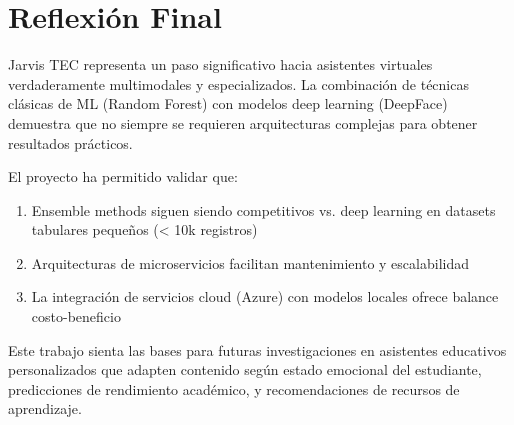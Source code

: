 \section{Reflexión Final}

Jarvis TEC representa un paso significativo hacia asistentes virtuales verdaderamente multimodales y especializados. La combinación de técnicas clásicas de ML (Random Forest) con modelos deep learning (DeepFace) demuestra que no siempre se requieren arquitecturas complejas para obtener resultados prácticos.

El proyecto ha permitido validar que:
\begin{enumerate}
    \item Ensemble methods siguen siendo competitivos vs. deep learning en datasets tabulares pequeños (< 10k registros)
    \item Arquitecturas de microservicios facilitan mantenimiento y escalabilidad
    \item La integración de servicios cloud (Azure) con modelos locales ofrece balance costo-beneficio
\end{enumerate}

Este trabajo sienta las bases para futuras investigaciones en asistentes educativos personalizados que adapten contenido según estado emocional del estudiante, predicciones de rendimiento académico, y recomendaciones de recursos de aprendizaje.
